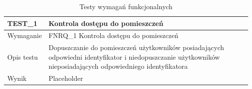         \begin{table}[h!]
            \caption{Testy wymagań funkcjonalnych}
            \centering
            \begin{subtable}[c]{\textwidth}
                \centering
                \begin{tabular}{|p{2cm}|p{12cm}|}
                    \hline TEST\_1      & \textbf{Kontrola dostępu do pomieszczeń} \\
                    \hline \cellcolor[gray]{0.8} Wymaganie    & FNRQ\_1 Kontrola dostępu do pomieszczeń  \\
                    \hline \cellcolor[gray]{0.8} Opis testu        & Dopuszczanie do pomieszczeń użytkowników posiadających odpowiedni identyfikator i niedopuszczanie użytkowników nieposiadających odpowiedniego identyfikatora  \\
                    \hline \cellcolor[gray]{0.8} Wynik        & Placeholder \\
                    \hline
                \end{tabular}
                \label{tbl:test1}
                \vspace{10mm}
            \end{subtable}
            \label{tbl:tests}
        \end{table}

